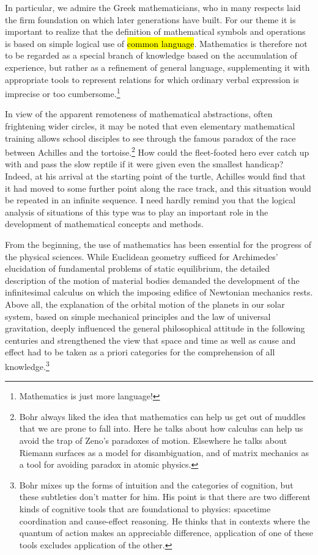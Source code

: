 \documentclass{tufte-handout}
\begin{document}
In particular, we admire the Greek mathematicians, who in many
respects laid the firm foundation on which later generations have
built.  For our theme it is important to realize that the definition
of mathematical symbols and operations is based on simple logical use
of \hl{common language}. Mathematics is therefore not to be regarded
as a special branch of knowledge based on the accumulation of
experience, but rather as a refinement of general language,
supplementing it with appropriate tools to represent relations for
which ordinary verbal expression is imprecise or too
cumbersome.\footnote{Mathematics is just more language!}

In view of the apparent remoteness of mathematical abstractions, often
frightening wider circles, it may be noted that even elementary
mathematical training allows school disciples to see through the
famous paradox of the race between Achilles and the
tortoise.\footnote{Bohr always liked the idea that mathematics can
  help us get out of muddles that we are prone to fall into. Here he
  talks about how calculus can help us avoid the trap of Zeno's
  paradoxes of motion. Elsewhere he talks about Riemann surfaces as a
  model for disambiguation, and of matrix mechanics as a tool for
  avoiding paradox in atomic physics.}  How could the fleet-footed
hero ever catch up with and pass the slow reptile if it were given
even the smallest handicap?  Indeed, at his arrival at the starting
point of the turtle, Achilles would find that it had moved to some
further point along the race track, and this situation would be
repeated in an infinite sequence. I need hardly remind you that the
logical analysis of situations of this type was to play an important
role in the development of mathematical concepts and methods.

From the beginning, the use of mathematics has been essential for the
progress of the physical sciences. While Euclidean geometry sufficed
for Archimedes’ elucidation of fundamental problems of static
equilibrium, the detailed description of the motion of material bodies
demanded the development of the infinitesimal calculus on which the
imposing edifice of Newtonian mechanics rests. Above all, the
explanation of the orbital motion of the planets in our solar system,
based on simple mechanical principles and the law of universal
gravitation, deeply influenced the general philosophical attitude in
the following centuries and strengthened the view that space and time
as well as cause and effect had to be taken as a priori categories for
the comprehension of all knowledge.\footnote{Bohr mixes up the forms
  of intuition and the categories of cognition, but these subtleties
  don't matter for him. His point is that there are two different
  kinds of cognitive tools that are foundational to physics: spacetime
  coordination and cause-effect reasoning. He thinks that in contexts
  where the quantum of action makes an appreciable difference,
  application of one of these tools excludes application of the
  other.}
\end{document}
